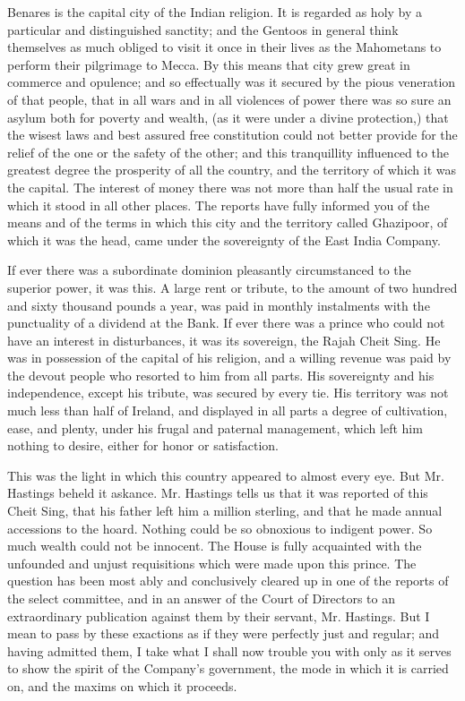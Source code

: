 Benares is the capital city of the Indian religion. It is regarded as holy by a particular and distinguished sanctity; and the Gentoos in general think themselves as much obliged to visit it once in their lives as the Mahometans to perform their pilgrimage to Mecca. By this means that city grew great in commerce and opulence; and so effectually was it secured by the pious veneration of that people, that in all wars and in all violences of power there was so sure an asylum both for poverty and wealth, (as it were under a divine protection,) that the wisest laws and best assured free constitution could not better provide for the relief of the one or the safety of the other; and this tranquillity influenced to the greatest degree the prosperity of all the country, and the territory of which it was the capital. The interest of money there was not more than half the usual rate in which it stood in all other places. The reports have fully informed you of the means and of the terms in which this city and the territory called Ghazipoor, of which it was the head, came under the sovereignty of the East India Company.

If ever there was a subordinate dominion pleasantly circumstanced to the superior power, it was this. A large rent or tribute, to the amount of two hundred and sixty thousand pounds a year, was paid in monthly instalments with the punctuality of a dividend at the Bank. If ever there was a prince who could not have an interest in disturbances, it was its sovereign, the Rajah Cheit Sing. He was in possession of the capital of his religion, and a willing revenue was paid by the devout people who resorted to him from all parts. His sovereignty and his independence, except his tribute, was secured by every tie. His territory was not much less than half of Ireland, and displayed in all parts a degree of cultivation, ease, and plenty, under his frugal and paternal management, which left him nothing to desire, either for honor or satisfaction.

This was the light in which this country appeared to almost every eye. But Mr. Hastings beheld it askance. Mr. Hastings tells us that it was reported of this Cheit Sing, that his father left him a million sterling, and that he made annual accessions to the hoard. Nothing could be so obnoxious to indigent power. So much wealth could not be innocent. The House is fully acquainted with the unfounded and unjust requisitions which were made upon this prince. The question has been most ably and conclusively cleared up in one of the reports of the select committee, and in an answer of the Court of Directors to an extraordinary publication against them by their servant, Mr. Hastings. But I mean to pass by these exactions as if they were perfectly just and regular; and having admitted them, I take what I shall now trouble you with only as it serves to show the spirit of the Company's government, the mode in which it is carried on, and the maxims on which it proceeds.

